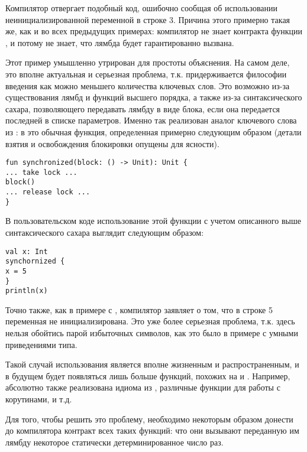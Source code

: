 Компилятор отвергает подобный код, ошибочно сообщая об использовании неинициализированной переменной в строке 3. Причина этого примерно такая же, как и во всех предыдущих примерах: компилятор не знает контракта функции , и потому не знает, что лямбда  будет гарантированно вызвана.

Этот пример умышленно утрирован для простоты объяснения. На самом деле, это вполне актуальная и серьезная проблема, т.к.  придерживается философии введения как можно меньшего количества ключевых слов. Это возможно из-за существования лямбд и функций высшего порядка, а также из-за синтаксического сахара, позволяющего передавать лямбду в виде блока, если она передается последней в списке параметров. Именно так реализован аналог ключевого слова  из : в  это обычная функция, определенная примерно следующим образом (детали взятия и освобождения блокировки опущены для ясности).

\begin{verbatim}
fun synchronized(block: () -> Unit): Unit {
... take lock ...
block()
... release lock ...
}
\end{verbatim}

В пользовательском коде использование этой функции с учетом описанного выше синтаксического сахара выглядит следующим образом:

\begin{verbatim}
val x: Int
synchornized {
x = 5
}
println(x)
\end{verbatim}

Точно также, как в примере с , компилятор заявляет о том, что в строке 5 переменная  не инициализирована. Это уже более серьезная проблема, т.к. здесь нельзя обойтись парой избыточных символов, как это было в примере с умными приведениями типа. 

Такой случай использования является вполне жизненным и распространенным, и в будущем будет появляться лишь больше функций, похожих на  и . Например, абсолютно также реализована идиома  из , различные функции для работы с корутинами, и т.д.

Для того, чтобы решить это проблему, необходимо некоторым образом донести до компилятора контракт всех таких функций: что они вызывают переданную им лямбду некоторое статически детерминированное число раз. 





